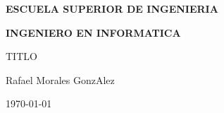 

\begin{titlepage}

  \begin{center}

    
    
    \vspace{2.0cm}
    
    \LARGE{\textbf{ESCUELA SUPERIOR DE INGENIERIA}} 
    
    \vspace{1.0cm}
    
    \Large{\textbf{INGENIERO  EN INFORMATICA  } }\\
    
    \vspace{3.0cm}
    
    \Large{TITLO} \\
    
    \vspace{2.0cm}
    
    \Large{Rafael Morales GonzAlez} \\
  
    \vspace{0.5cm}

    \large{\today}
    
  \end{center}
  
\end{titlepage}
